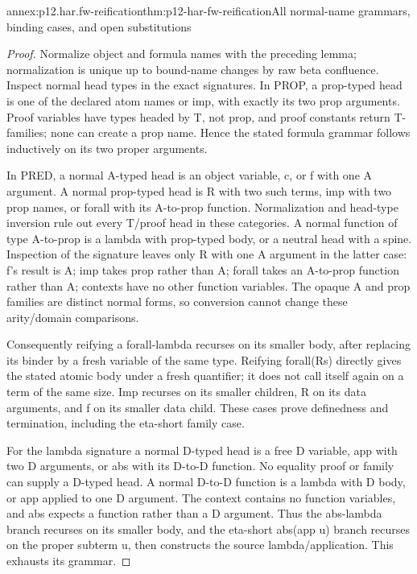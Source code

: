 \begin{annexitem}{annex:p12.har.fw-reification}{thm:p12-har-fw-reification}{All normal-name grammars, binding cases, and open substitutions}
\begin{proof}
Normalize object and formula names with the preceding lemma; normalization
is unique up to bound-name changes by raw beta confluence. Inspect normal
head types in the exact signatures. In PROP, a prop-typed head is one
of the declared atom names or imp, with exactly its two prop arguments.
Proof variables have types headed by T, not prop, and proof constants
return T-families; none can create a prop name. Hence the stated formula
grammar follows inductively on its two proper arguments.

In PRED, a normal A-typed head is an object variable, c, or f with one
A argument. A normal prop-typed head is R with two such terms, imp with
two prop names, or forall with its A-to-prop function. Normalization and
head-type inversion rule out every T/proof head in these categories.
A normal function of type A-to-prop is a lambda with prop-typed body,
or a neutral head with a spine. Inspection of the signature leaves
only R with one A argument in the latter case: f's result is A;
imp takes prop rather than A; forall takes an A-to-prop function rather
than A; contexts have no other function variables. The opaque A and
prop families are distinct normal forms, so conversion cannot change
these arity/domain comparisons.

Consequently reifying a forall-lambda recurses on its smaller body,
after replacing its binder by a fresh variable of the same type.
Reifying forall(Rs) directly gives the stated atomic body under a fresh
quantifier; it does not call itself again on a term of the same size.
Imp recurses on its smaller children, R on its data arguments, and f
on its smaller data child. These cases prove definedness and termination,
including the eta-short family case.

For the lambda signature a normal D-typed head is a free D variable,
app with two D arguments, or abs with its D-to-D function. No equality
proof or family can supply a D-typed head. A normal D-to-D function
is a lambda with D body, or app applied to one D argument. The context
contains no function variables, and abs expects a function rather than
a D argument. Thus the abs-lambda branch recurses on its smaller body,
and the eta-short abs(app u) branch recurses on the proper subterm u,
then constructs the source lambda/application. This exhausts its grammar.


\end{proof}
\end{annexitem}
